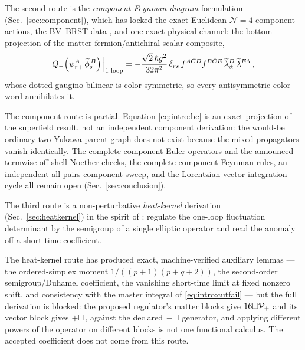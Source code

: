 The second route is the \emph{component Feynman-diagram} formulation (Sec.~\ref{sec:component}), which has locked the
exact Euclidean $\mathcal N=4$ component actions, the BV--BRST data \cite{BV}, and one exact physical channel: the bottom
projection of the matter-fermion/antichiral-scalar composite,
\begin{equation}\label{eq:intro:bc}
Q_-\!\left(\psi_{r+}^A\,\widetilde\phi_s^{\,B}\right)\Big|_{\text{1-loop}}
=-\frac{\sqrt2\,\hbar g^2}{32\pi^2}\,\delta_{rs}\,f^{ACD}f^{BCE}\,
\widetilde\lambda_{\dot\alpha}^D\,\widetilde\lambda^{E\dot\alpha}\,,
\end{equation}
whose dotted-gaugino bilinear is color-symmetric, so every antisymmetric color word annihilates it.
\begin{remark}\label{rem:intro:component}
The component route is partial. Equation \eqref{eq:intro:bc} is an exact projection of the superfield result, not an
independent component derivation: the would-be ordinary two-Yukawa parent graph does not exist because the mixed
propagators vanish identically. The complete component Euler operators and the announced termwise off-shell Noether
checks, the complete component Feynman rules, an independent all-pairs component sweep, and the Lorentzian vector
integration cycle all remain open (Sec.~\ref{sec:conclusion}).
\end{remark}

The third route is a non-perturbative \emph{heat-kernel} derivation (Sec.~\ref{sec:heatkernel}) in the spirit of
\cite{Vassilevich}: regulate the one-loop fluctuation determinant by the semigroup of a single elliptic operator and read
the anomaly off a short-time coefficient.
\begin{remark}\label{rem:intro:heatkernel}
The heat-kernel route has produced exact, machine-verified auxiliary lemmas --- the ordered-simplex moment
$1/((p+1)(p+q+2))$, the second-order semigroup/Duhamel coefficient, the vanishing short-time limit at fixed nonzero shift,
and consistency with the master integral of \eqref{eq:intro:cutfail} --- but the full derivation is blocked: the proposed
regulator's matter blocks give $16\Box\mathcal P_+$ and its vector block gives $+\Box$, against the declared $-\Box$
generator, and applying different powers of the operator on different blocks is not one functional calculus. The accepted
coefficient does not come from this route.
\end{remark}


